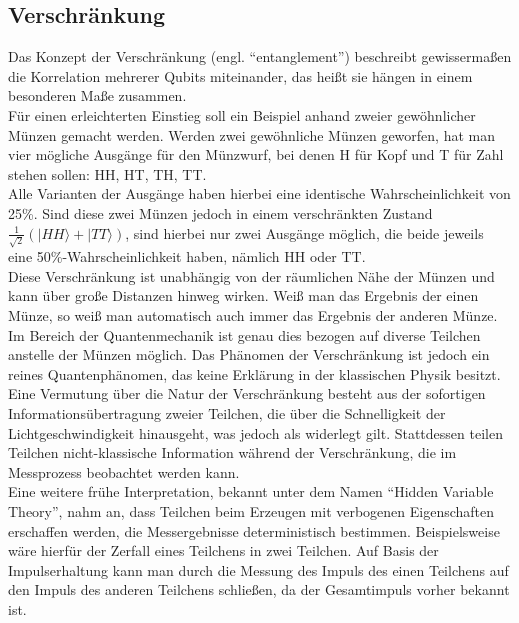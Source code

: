 \subsection{Verschränkung }

Das Konzept der Verschränkung (engl. ``entanglement'') beschreibt gewissermaßen die Korrelation mehrerer Qubits miteinander, das heißt sie hängen in einem besonderen Maße zusammen. \\
Für einen erleichterten Einstieg soll ein Beispiel anhand zweier gewöhnlicher Münzen gemacht werden. Werden zwei gewöhnliche Münzen geworfen, hat man vier mögliche Ausgänge für den Münzwurf, bei denen H für Kopf und T für Zahl stehen sollen: HH, HT, TH, TT. \\
Alle Varianten der Ausgänge haben hierbei eine identische Wahrscheinlichkeit von 25\%. Sind diese zwei Münzen jedoch in einem verschränkten Zustand  $\frac{1}{\sqrt{2}} \left( \lvert HH \rangle + \lvert TT \rangle \right)$, sind hierbei nur zwei Ausgänge möglich, die beide jeweils eine 50\%-Wahrscheinlichkeit haben, nämlich HH oder TT. \\
Diese Verschränkung ist unabhängig von der räumlichen Nähe der Münzen und kann über große Distanzen hinweg wirken. Weiß man das Ergebnis der einen Münze, so weiß man automatisch auch immer das Ergebnis der anderen Münze. Im Bereich der Quantenmechanik ist genau dies bezogen auf diverse Teilchen anstelle der Münzen möglich. 
Das Phänomen der Verschränkung ist jedoch ein reines Quantenphänomen, das keine Erklärung in der klassischen Physik besitzt. \\
Eine Vermutung über die Natur der Verschränkung besteht aus der sofortigen Informationsübertragung zweier Teilchen, die über die Schnelligkeit der Lichtgeschwindigkeit hinausgeht, was jedoch als widerlegt gilt. Stattdessen teilen Teilchen nicht-klassische Information während der Verschränkung, die im Messprozess beobachtet werden kann. \\
Eine weitere frühe Interpretation, bekannt unter dem Namen ``Hidden Variable Theory'', nahm an, dass Teilchen beim Erzeugen mit verbogenen Eigenschaften erschaffen werden, die Messergebnisse deterministisch bestimmen. Beispielsweise wäre hierfür der Zerfall eines Teilchens in zwei Teilchen. Auf Basis der Impulserhaltung kann man durch die Messung des Impuls des einen Teilchens auf den Impuls des anderen Teilchens schließen, da der Gesamtimpuls vorher bekannt ist. 
\cite{hughes_quantum_2021}
\\

